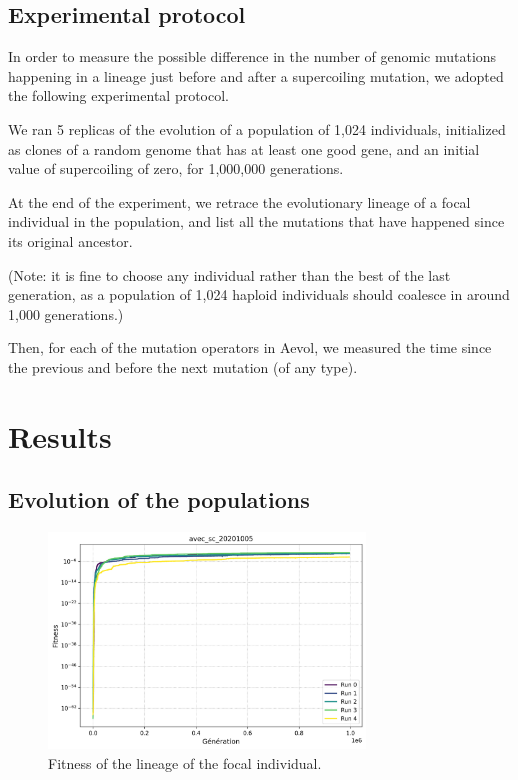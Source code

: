 \subsection{Experimental protocol}

In order to measure the possible difference in the number of genomic mutations happening in a lineage just before and after a supercoiling mutation, we adopted the following experimental protocol.

We ran 5 replicas of the evolution of a population of 1,024 individuals, initialized as clones of a random genome that has at least one good gene, and an initial value of supercoiling of zero, for 1,000,000 generations.

At the end of the experiment, we retrace the evolutionary lineage of a focal individual in the population, and list all the mutations that have happened since its original ancestor.

(Note: it is fine to choose any individual rather than the best of the last generation, as a population of 1,024 haploid individuals should coalesce in around 1,000 generations.)

Then, for each of the mutation operators in Aevol, we measured the time since the previous and before the next mutation (of any type).

\pagebreak

\section{Results}

\subsection{Evolution of the populations}

\begin{figure}[h!]
  \centering
  \includegraphics[width=0.75\textwidth]{aevol/images/fitness_agrege.png}
  \caption{Fitness of the lineage of the focal individual.}
  \label{fig:fitness}
\end{figure}


